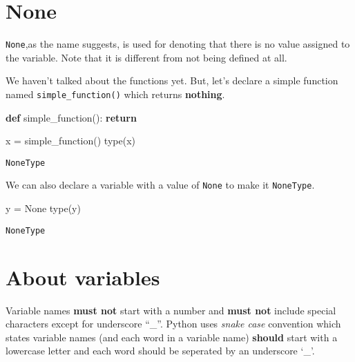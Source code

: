 \documentclass[
  letterpaper,
  DIV=11,
  numbers=noendperiod]{scrreprt}
\newenvironment{Shaded}{\begin{snugshade}}{\end{snugshade}}
\newcommand{\BuiltInTok}[1]{\textcolor[rgb]{0.00,0.23,0.31}{#1}}
\newcommand{\ControlFlowTok}[1]{\textcolor[rgb]{0.00,0.23,0.31}{\textbf{#1}}}
\newcommand{\KeywordTok}[1]{\textcolor[rgb]{0.00,0.23,0.31}{\textbf{#1}}}
\newcommand{\NormalTok}[1]{\textcolor[rgb]{0.00,0.23,0.31}{#1}}
\newcommand{\OperatorTok}[1]{\textcolor[rgb]{0.37,0.37,0.37}{#1}}
\newcommand{\VariableTok}[1]{\textcolor[rgb]{0.07,0.07,0.07}{#1}}
\begin{document}
\section{None}\label{none}

\texttt{None},as the name suggests, is used for denoting that there is
no value assigned to the variable. Note that it is different from not
being defined at all.

We haven't talked about the functions yet. But, let's declare a simple
function named \texttt{simple\_function()} which returns
\textbf{nothing}.

\begin{Shaded}
\begin{Highlighting}[]
\KeywordTok{def}\NormalTok{ simple\_function():}
    \ControlFlowTok{return}
\end{Highlighting}
\end{Shaded}

\begin{Shaded}
\begin{Highlighting}[]
\NormalTok{x }\OperatorTok{=}\NormalTok{ simple\_function()}
\BuiltInTok{type}\NormalTok{(x)}
\end{Highlighting}
\end{Shaded}

\begin{verbatim}
NoneType
\end{verbatim}

We can also declare a variable with a value of \texttt{None} to make it
\texttt{NoneType}.

\begin{Shaded}
\begin{Highlighting}[]
\NormalTok{y }\OperatorTok{=} \VariableTok{None}
\BuiltInTok{type}\NormalTok{(y)}
\end{Highlighting}
\end{Shaded}

\begin{verbatim}
NoneType
\end{verbatim}

\section{About variables}\label{about-variables}

Variable names \textbf{must not} start with a number and \textbf{must
not} include special characters except for underscore ``\_''. Python
uses \emph{snake case} convention which states variable names (and each
word in a variable name) \textbf{should} start with a lowercase letter
and each word should be seperated by an underscore `\_'.
\end{document}
